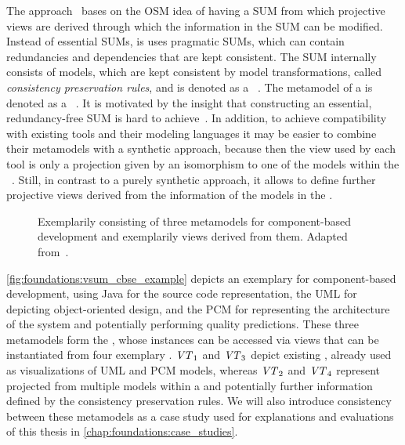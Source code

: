 The \vitruv approach~ bases on the \gls{OSM} idea of having a \gls{SUM} from which projective views are derived through which the information in the \gls{SUM} can be modified.
Instead of essential \glspl{SUM}, is uses pragmatic \glspl{SUM}, which can contain redundancies and dependencies that are kept consistent.
The \gls{SUM} internally consists of models, which are kept consistent by model transformations, called \emph{consistency preservation rules}, and is denoted as a \vsum~.
The metamodel of a \vsum is denoted as a \vsumm~.
It is motivated by the insight that constructing an essential, redundancy-free \gls{SUM} is hard to achieve~.
In addition, to achieve compatibility with existing tools and their modeling languages it may be easier to combine their metamodels with a synthetic approach, because then the view used by each tool is only a projection given by an isomorphism to one of the models within the \vsum~.
Still, in contrast to a purely synthetic approach, it allows to define further projective views derived from the information of the models in the \vsum.

\begin{figure}
    \centering
    
    \caption[Exemplary \acrshort{VSUMM}]{Exemplarily \vsumm consisting of three metamodels for component-based development and exemplarily views derived from them. Adapted from~\cite[Fig.~4.4]{langhammer2017a}.}
    \label{fig:foundations:vsum_cbse_example}
\end{figure}

\autoref{fig:foundations:vsum_cbse_example} depicts an exemplary \vsumm for component-based development, using Java for the source code representation, the \gls{UML} for depicting object-oriented design, and the \gls{PCM} for representing the architecture of the system and potentially performing quality predictions.
These three metamodels form the \vsumm, whose instances can be accessed via views that can be instantiated from four exemplary \viewtypes.
$\mathit{VT}_1$ and $\mathit{VT}_3$ depict existing \viewtypes, already used as visualizations of \gls{UML} and \gls{PCM} models, whereas $\mathit{VT}_2$ and $\mathit{VT}_4$ represent \viewtypes projected from multiple models within a \vsum and potentially further information defined by the consistency preservation rules.
We will also introduce consistency between these metamodels as a case study used for explanations and evaluations of this thesis in \autoref{chap:foundations:case_studies}.

